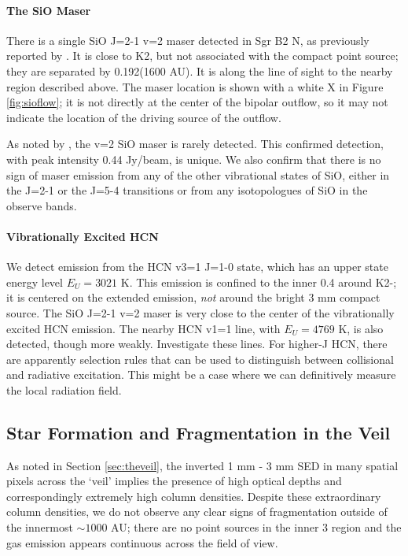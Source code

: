 \documentclass[twocolumn]{aastex61}
\begin{document}
\paragraph{The SiO Maser}
There is a single SiO J=2-1 v=2 maser detected in Sgr B2 N, as previously
reported by \citet{Higuchi2015a}.  It is close to K2,
but not associated with the compact point source; they are separated
by 0.192\arcsec (1600 AU).  It is along the
line of sight to the nearby \hii region described above.
The maser location is shown with a white X in Figure \ref{fig:sioflow}; it is
not directly at the center of the bipolar outflow, so it may not indicate
the location of the driving source of the outflow.

As noted by \citet{Higuchi2015a}, the v=2 SiO maser is rarely detected.  This
confirmed detection, with peak intensity 0.44 Jy/beam, is unique.  We also
confirm that there is no sign of maser emission from any of the other
vibrational states of SiO, either in the J=2-1 or the J=5-4 transitions
or from any isotopologues of SiO in the observe bands.

\paragraph{Vibrationally Excited HCN}
We detect emission from the HCN v3=1 J=1-0 state, which has an upper state
energy level $E_U = 3021$ K.  This emission is confined to the inner 0.4\arcsec
around K2-\hii; it is centered on the extended emission, \emph{not} around the
bright 3 mm compact source.  The SiO J=2-1 v=2 maser is very close to the center
of the vibrationally excited HCN emission.  The nearby HCN v1=1 line, with
$E_U=4769$ K, is also detected, though more weakly.
{\color{red} Investigate these lines.  For higher-J HCN, there are apparently
selection rules that can be used to distinguish between collisional and radiative
excitation.  This might be a case where we can definitively measure the local
radiation field.}

\subsection{Star Formation and Fragmentation in the Veil}
As noted in Section \ref{sec:theveil}, the inverted 1 mm - 3 mm SED in many
spatial pixels across the `veil' implies the presence of high optical depths
and correspondingly extremely high column densities.
Despite these extraordinary column densities, we do not observe any clear
signs of fragmentation outside of the innermost $\sim1000$ AU; there are no
point sources in the inner 3 \arcsec region and the gas emission appears
continuous across the field of view.
\end{document}

